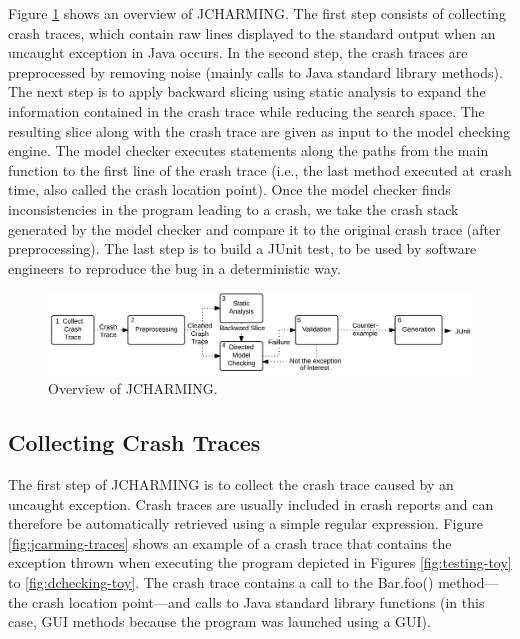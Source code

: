 \documentclass[times]{smrauth}
\begin{document}
Figure \ref{fig:jcarming-approach} shows an overview of JCHARMING. The first step
consists of collecting crash traces, which contain raw lines
displayed to the standard output when an uncaught exception
in Java occurs. In the second step, the crash traces are
preprocessed by removing noise (mainly calls to Java standard
library methods). The next step is to apply backward slicing
using static analysis to expand the information contained in
the crash trace while reducing the search space. The resulting
slice along with the crash trace are given as input to the model
checking engine. The model checker executes statements
along the paths from the main function to the first line of the
crash trace (i.e., the last method executed at crash time, also
called the crash location point). Once the model checker finds
inconsistencies in the program leading to a crash, we take the
crash stack generated by the model checker and compare it to
the original crash trace (after preprocessing). The last step is
to build a JUnit test, to be used by software engineers to
reproduce the bug in a deterministic way.

\begin{figure}[h!]
  \centering
    \includegraphics[scale=0.8]{media/jcharming-approach.png}
    \caption{Overview of JCHARMING.
    \label{fig:jcarming-approach}}
\end{figure}

\subsection{Collecting Crash Traces}

The first step of JCHARMING is to collect the crash trace
caused by an uncaught exception. Crash traces are usually included in crash reports and can therefore be automatically
retrieved using a simple regular expression.
Figure \ref{fig:jcarming-traces} shows an example of a crash trace that contains the
exception thrown when executing the program depicted in
Figures \ref{fig:testing-toy} to \ref{fig:dchecking-toy}. The crash trace contains a call to the Bar.foo()
method—the crash location point—and calls to Java standard
library functions (in this case, GUI methods because the
program was launched using a GUI).
\end{document}
